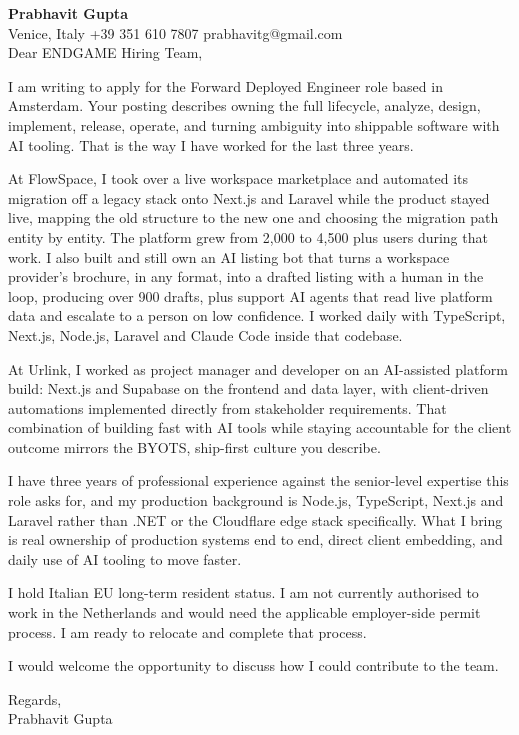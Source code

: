 \documentclass[a4paper,10.5pt]{article}
\begin{document}
\textbf{Prabhavit Gupta}\\
Venice, Italy \textbar{} +39 351 610 7807 \textbar{} prabhavitg@gmail.com\\[10pt]
Dear ENDGAME Hiring Team,

I am writing to apply for the Forward Deployed Engineer role based in Amsterdam. Your posting describes owning the full lifecycle, analyze, design, implement, release, operate, and turning ambiguity into shippable software with AI tooling. That is the way I have worked for the last three years.

At FlowSpace, I took over a live workspace marketplace and automated its migration off a legacy stack onto Next.js and Laravel while the product stayed live, mapping the old structure to the new one and choosing the migration path entity by entity. The platform grew from 2,000 to 4,500 plus users during that work. I also built and still own an AI listing bot that turns a workspace provider's brochure, in any format, into a drafted listing with a human in the loop, producing over 900 drafts, plus support AI agents that read live platform data and escalate to a person on low confidence. I worked daily with TypeScript, Next.js, Node.js, Laravel and Claude Code inside that codebase.

At Urlink, I worked as project manager and developer on an AI-assisted platform build: Next.js and Supabase on the frontend and data layer, with client-driven automations implemented directly from stakeholder requirements. That combination of building fast with AI tools while staying accountable for the client outcome mirrors the BYOTS, ship-first culture you describe.

I have three years of professional experience against the senior-level expertise this role asks for, and my production background is Node.js, TypeScript, Next.js and Laravel rather than .NET or the Cloudflare edge stack specifically. What I bring is real ownership of production systems end to end, direct client embedding, and daily use of AI tooling to move faster.

I hold Italian EU long-term resident status. I am not currently authorised to work in the Netherlands and would need the applicable employer-side permit process. I am ready to relocate and complete that process.

I would welcome the opportunity to discuss how I could contribute to the team.

Regards,\\
Prabhavit Gupta
\end{document}
